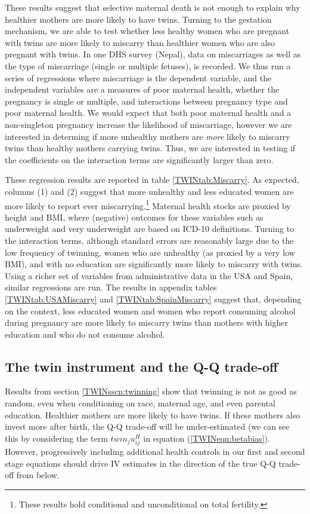 \documentclass[subeqn]{article}
\begin{document}
\begin{spacing}{1.4}
These results suggest that selective maternal death is not enough to explain
why healthier mothers are more likely to have twins. Turning to the gestation 
mechanism, we are able to test whether less healthy women who are pregnant with 
twins are more likely to miscarry than healthier women who are also pregnant 
with twins.  In one DHS survey (Nepal), data on miscarriages as well as the 
type of miscarriage (single or multiple fetuses), is recorded.  We thus run a 
series of regressions where miscarriage is the dependent variable, and the 
independent variables are a measures of poor maternal health, whether the 
pregnancy is single or multiple, and interactions between pregnancy type and 
poor maternal health.  We would expect that both poor maternal health and a 
non-singleton pregnancy increase the likelihood of miscarriage, however we are 
interested in determing if more unhealthy mothers are \emph{more} likely to 
miscarry twins than healthy mothers carrying twins.  Thus, we are interested in 
testing if the coefficients on the interaction terms are significantly larger 
than zero.

These regression results are reported in table \ref{TWINtab:Miscarry}.  As 
expected, columns (1) and (2) suggest that more unhealthy and less educated
women are more likely to report ever miscarrying.\footnote{These results hold 
conditional and unconditional on total fertility.}  Maternal health stocks are 
proxied by height and BMI, where (negative) outcomes for these variables such as 
underweight and very underweight are based on ICD-10 definitions. Turning to the 
interaction terms, although standard errors are reasonably large due to the low 
frequency of twinning, women who are unhealthy (as proxied by a very low BMI), 
and with no education are significantly more likely to miscarry with twins.  
Using a richer set of variables from administrative data in the USA and Spain, 
similar regressions are run.  The results in appendix tables 
\ref{TWINtab:USAMiscarry} and \ref{TWINtab:SpainMiscarry} suggest that, 
depending on the context, less educated women and women who report consuming 
alcohol during pregnancy are more likely to miscarry twins than mothers with 
higher education and who do not consume alcohol.

\subsection{The twin instrument and the Q-Q trade-off} \label{TWINsscn:QQtwins}
Results from section \ref{TWINsscn:twinning} show that twinning is not as good
as random, even when conditioning on race, maternal age, and even parental 
education. Healthier mothers are more likely to have twins. If these mothers 
also invest more after birth, the Q-Q trade-off will be under-estimated (we can 
see this by considering the term $twin_ju^H_{ij}$ in equation 
(\ref{TWINeqn:betabias}).  However, progressively including additional health
controls in our first and second stage equations should drive IV estimates in 
the direction of the true Q-Q trade-off from below.


\end{spacing}
\end{document}
